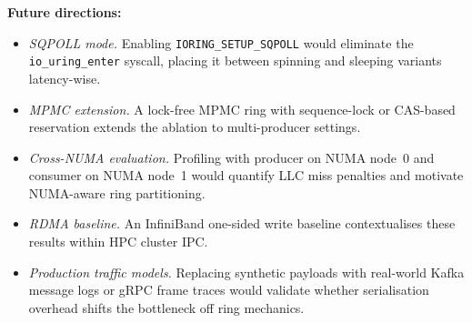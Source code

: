 \documentclass[10pt,conference]{IEEEtran}
\begin{document}
\textbf{Future directions:}
\begin{itemize}
  \item \emph{SQPOLL mode.}  Enabling \texttt{IORING\_SETUP\_SQPOLL} would
        eliminate the \texttt{io\_uring\_enter} syscall, placing it between
        spinning and sleeping variants latency-wise.
  \item \emph{MPMC extension.}  A lock-free MPMC ring with sequence-lock or
        CAS-based reservation extends the ablation to multi-producer settings.
  \item \emph{Cross-NUMA evaluation.}  Profiling with producer on NUMA node~0
        and consumer on NUMA node~1 would quantify LLC miss penalties and
        motivate NUMA-aware ring partitioning.
  \item \emph{RDMA baseline.}  An InfiniBand one-sided write baseline
        contextualises these results within HPC cluster IPC.
  \item \emph{Production traffic models.}  Replacing synthetic payloads with
        real-world Kafka message logs or gRPC frame traces would validate
        whether serialisation overhead shifts the bottleneck off ring mechanics.
\end{itemize}
\end{document}
